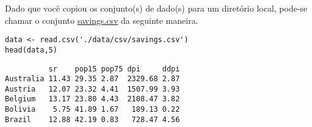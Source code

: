 \documentclass[11pt]{article}
\begin{document}
Dado que você copiou os conjunto(s) de dado(s) para um diretório
local, pode-se chamar o conjunto \href{https://drive.google.com/file/d/1j2K7J1rb3V2Qr\_t0rcBhA6tyuqh88AjY/view?usp=sharing}{savings.csv} da seguinte maneira.

\begin{verbatim}
data <- read.csv('./data/csv/savings.csv')
head(data,5)
\end{verbatim}

\begin{verbatim}
          sr    pop15 pop75 dpi     ddpi
Australia 11.43 29.35 2.87  2329.68 2.87
Austria   12.07 23.32 4.41  1507.99 3.93
Belgium   13.17 23.80 4.43  2108.47 3.82
Bolivia    5.75 41.89 1.67   189.13 0.22
Brazil    12.88 42.19 0.83   728.47 4.56
\end{verbatim}
\end{document}
